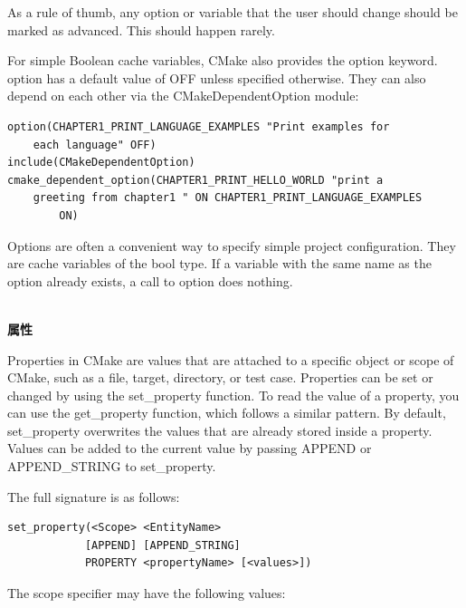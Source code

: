 As a rule of thumb, any option or variable that the user should change should be marked as advanced. This should happen rarely.

For simple Boolean cache variables, CMake also provides the option keyword. option
has a default value of OFF unless specified otherwise. They can also depend on each other via the CMakeDependentOption module:

\begin{lstlisting}[style=styleCMake]
option(CHAPTER1_PRINT_LANGUAGE_EXAMPLES "Print examples for 
	each language" OFF)
include(CMakeDependentOption)
cmake_dependent_option(CHAPTER1_PRINT_HELLO_WORLD "print a
	greeting from chapter1 " ON CHAPTER1_PRINT_LANGUAGE_EXAMPLES
		ON)
\end{lstlisting}

Options are often a convenient way to specify simple project configuration. They are cache variables of the bool type. If a variable with the same name as the option already exists, a call to option does nothing.

\hspace*{\fill} \\ %
\noindent
\textbf{属性}

Properties in CMake are values that are attached to a specific object or scope of CMake, such as a file, target, directory, or test case. Properties can be set or changed by using the set\_property function. To read the value of a property, you can use the get\_property function, which follows a similar pattern. By default, set\_property overwrites the values that are already stored inside a property. Values can be added to the current value by passing APPEND or APPEND\_STRING to set\_property.

The full signature is as follows:

\begin{lstlisting}[style=styleCMake]
set_property(<Scope> <EntityName>
			[APPEND] [APPEND_STRING]
			PROPERTY <propertyName> [<values>])
\end{lstlisting}

The scope specifier may have the following values:

